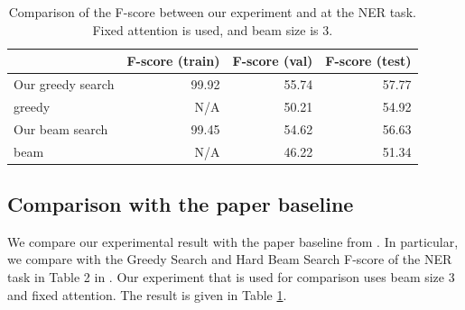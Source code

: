 \documentclass[11pt,a4paper]{article}
\begin{document}
\begin{table}[ht]
\centering
\caption{Comparison of the F-score between our experiment and \cite{goyal2017continuous} at the NER task. Fixed attention is used, and beam size is 3.}
\label{tab:comp}
\begin{tabular}{lrrr}
\toprule
                  & F-score (train)  & F-score (val)   & F-score (test)   \\  \midrule
Our greedy search          & 99.92            & 55.74     & 57.77              \\
\cite{goyal2017continuous} greedy  & N/A              & 50.21    & 54.92              \\
Our beam search          & 99.45              & 54.62   & 56.63               \\
\cite{goyal2017continuous} beam  & N/A              & 46.22   & 51.34             \\ \bottomrule
\end{tabular}
\end{table}










\subsection{Comparison with the paper baseline}

We compare our experimental result with the paper baseline from \cite{goyal2017continuous}. In particular, we compare with the Greedy Search and Hard Beam Search F-score of the NER task in Table 2 in \cite{goyal2017continuous}. Our experiment that is used for comparison uses beam size 3 and fixed attention. The result is given in Table \ref{tab:comp}.
\end{document}

